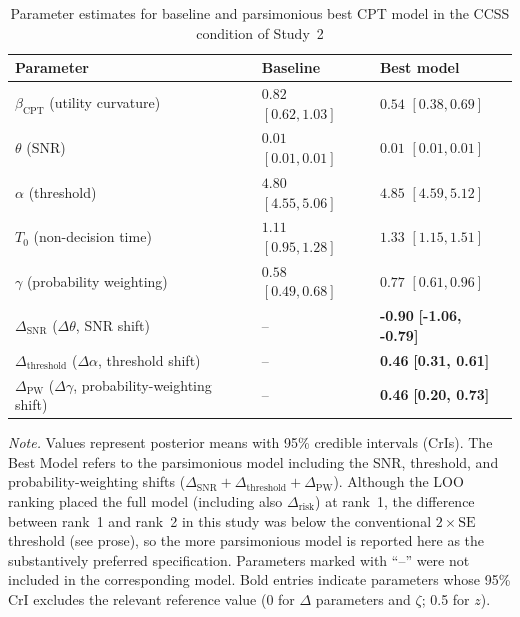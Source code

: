\documentclass[man,floatsintext]{apa7}
\begin{document}
\begin{table}[!htbp]
\centering
\begin{threeparttable}\small
\caption{Parameter estimates for baseline and parsimonious best CPT model in the CCSS condition of Study~2}
\label{tab:cpt_pe_ccss_study2}
\begin{tabularx}{\linewidth}{@{} >{\raggedright\arraybackslash}p{6cm} >{\centering\arraybackslash}X >{\centering\arraybackslash}X @{}}
\toprule
\textbf{Parameter} & \textbf{Baseline} & \textbf{Best model} \\
\midrule
$\beta_{\text{CPT}}$ (utility curvature) & $0.82$ $[0.62, 1.03]$ & $0.54$ $[0.38, 0.69]$ \\
$\theta$ (SNR) & $0.01$ $[0.01, 0.01]$ & $0.01$ $[0.01, 0.01]$ \\
$\alpha$ (threshold) & $4.80$ $[4.55, 5.06]$ & $4.85$ $[4.59, 5.12]$ \\
$T_0$ (non-decision time) & $1.11$ $[0.95, 1.28]$ & $1.33$ $[1.15, 1.51]$ \\
$\gamma$ (probability weighting) & $0.58$ $[0.49, 0.68]$ & $0.77$ $[0.61, 0.96]$ \\
$\Delta_{\text{SNR}}$ ($\Delta\theta$, SNR shift) & -- & \textbf{-0.90} \textbf{[-1.06, -0.79]} \\
$\Delta_{\text{threshold}}$ ($\Delta\alpha$, threshold shift) & -- & \textbf{0.46} \textbf{[0.31, 0.61]} \\
$\Delta_{\text{PW}}$ ($\Delta\gamma$, probability-weighting shift) & -- & \textbf{0.46} \textbf{[0.20, 0.73]} \\
\bottomrule
\end{tabularx}
\begin{tablenotes}
\item \textit{Note.} Values represent posterior means with 95\% credible intervals (CrIs). The Best Model refers to the parsimonious model including the SNR, threshold, and probability-weighting shifts ($\Delta_{\text{SNR}}+\Delta_{\text{threshold}}+\Delta_{\text{PW}}$). Although the LOO ranking placed the full model (including also $\Delta_{\text{risk}}$) at rank~1, the difference between rank~1 and rank~2 in this study was below the conventional $2 \times \mathrm{SE}$ threshold (see prose), so the more parsimonious model is reported here as the substantively preferred specification. Parameters marked with ``--'' were not included in the corresponding model. Bold entries indicate parameters whose 95\% CrI excludes the relevant reference value (0 for $\Delta$ parameters and $\zeta$; 0.5 for $z$).
\end{tablenotes}
\end{threeparttable}
\end{table}
\end{document}
